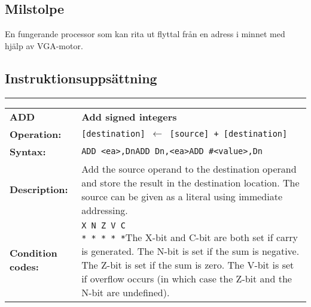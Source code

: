 \documentclass[]{article}
\begin{document}
\subsection{Milstolpe}
En fungerande processor som kan rita ut flyttal från en adress i minnet med hjälp av VGA-motor.

\clearpage
\begin{appendices}
\section{Instruktionsuppsättning}
\noindent\rule{10cm}{1pt}\newline %
\setlength\extrarowheight{5pt} %
\begin{tabularx}{\textwidth}{lL}
  {\Large \textbf{ADD}} 	& {\Large \textbf{Add signed integers}}\\
  \textbf{Operation:} 		& \texttt{[destination] $\leftarrow$ [source] + [destination]}\\
  \textbf{Syntax:}  		& \texttt{ADD <ea>,Dn}\newline\texttt{ADD Dn,<ea>}\newline\texttt{ADD \#<value>,Dn}\\
  \textbf{Description:}  	& Add the source operand to the destination operand and store the
result in the destination location. The source can be given as a literal using immediate addressing.\\
  \textbf{Condition codes:} & \texttt{X N Z V C\newline * * * * *}\newline\newline The X-bit and C-bit are both set if carry is generated. The N-bit is set if the sum is negative. The Z-bit is set if the sum is zero. The V-bit is set if overflow occurs (in which case the Z-bit and the N-bit are undefined).\\
\end{tabularx}
\newline


\end{appendices}
\end{document}
